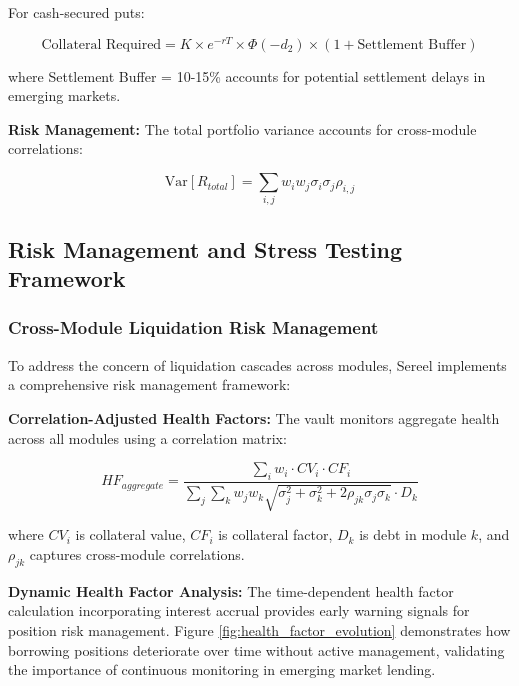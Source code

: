 \documentclass[12pt]{article}
\begin{document}
For cash-secured puts:

\begin{equation}
\text{Collateral Required} = K \times e^{-rT} \times \Phi(-d_2) \times (1 + \text{Settlement Buffer})
\end{equation}

where Settlement Buffer = 10-15\% accounts for potential settlement delays in emerging markets.

\textbf{Risk Management:}
The total portfolio variance accounts for cross-module correlations:

\begin{equation}
\text{Var}[R_{total}] = \sum_{i,j} w_i w_j \sigma_i \sigma_j \rho_{i,j}
\end{equation}
\subsection{Risk Management and Stress Testing Framework}

\subsubsection{Cross-Module Liquidation Risk Management}

To address the concern of liquidation cascades across modules, Sereel implements a comprehensive risk management framework:

\textbf{Correlation-Adjusted Health Factors:}
The vault monitors aggregate health across all modules using a correlation matrix:

\begin{equation}
HF_{aggregate} = \frac{\sum_i w_i \cdot CV_i \cdot CF_i}{\sum_j \sum_k w_j w_k \sqrt{\sigma_j^2 + \sigma_k^2 + 2\rho_{jk}\sigma_j\sigma_k} \cdot D_k}
\end{equation}

where $CV_i$ is collateral value, $CF_i$ is collateral factor, $D_k$ is debt in module $k$, and $\rho_{jk}$ captures cross-module correlations.

\textbf{Dynamic Health Factor Analysis:}
The time-dependent health factor calculation incorporating interest accrual provides early warning signals for position risk management. Figure \ref{fig:health_factor_evolution} demonstrates how borrowing positions deteriorate over time without active management, validating the importance of continuous monitoring in emerging market lending.
\end{document}
